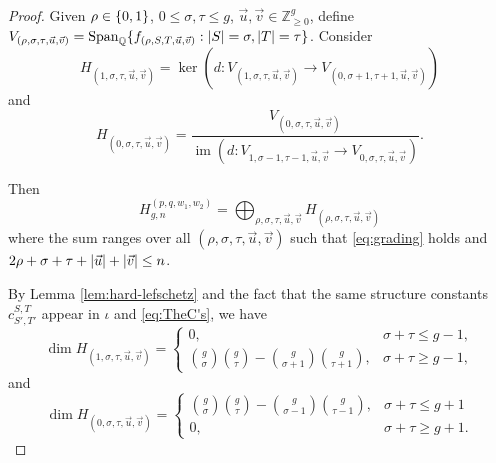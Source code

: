 \documentclass[10pt,a4paper]{amsart}
\DeclareMathOperator{\im}{im}
\DeclarePairedDelimiter{\abs}{\lvert}{\rvert}
\DeclarePairedDelimiter{\set}{\{}{\}}
\newcommand\Q{{\mathbb Q}}
\newcommand\Z{{\mathbb Z}}
\begin{document}
\begin{proof}

Given $\rho\in \set{0,1}$, $0\leq \sigma,\tau\leq g$, $\vec u,\vec v\in \Z_{\geq 0}^g$, define $V_{(\rho,\sigma,\tau,\vec u,\vec v)}=\mathrm{Span}_\Q\set{f_{(\rho,S,T,\vec u,\vec v)}: \abs{S}=\sigma, \abs{T}=\tau}$. Consider
\begin{equation}
    H_{(1,\sigma,\tau,\vec u,\vec v)}=\ker(d:V_{(1,\sigma,\tau,\vec u,\vec v)}\to V_{(0,\sigma+1,\tau+1,\vec u,\vec v)})
\end{equation}
and
\begin{equation}
    H_{(0,\sigma,\tau,\vec u,\vec v)}=\frac{V_{(0,\sigma,\tau,\vec u,\vec v)}}{\im(d:V_{1,\sigma-1,\tau-1,\vec u,\vec v}\to V_{0,\sigma,\tau,\vec u,\vec v})}.
\end{equation}

Then
\begin{equation}
    H_{g,n}^{(p,q,w_1,w_2)}=\bigoplus_{\rho,\sigma,\tau,\vec u,\vec v}H_{(\rho,\sigma,\tau,\vec u,\vec v)}
\end{equation}
where the sum ranges over all $(\rho,\sigma,\tau,\vec u,\vec v)$ such that \eqref{eq:grading} holds and $2\rho+\sigma+\tau+\abs{\vec u}+\abs{\vec v}\leq n$. 

By Lemma \ref{lem:hard-lefschetz} and the fact that the same structure constants $c^{S,T}_{S',T'}$ appear in $\iota$ and \eqref{eq:TheC's}, we have
\begin{equation}
    \dim H_{(1,\sigma,\tau,\vec u,\vec v)}=
    \begin{cases}
        0, & \sigma+\tau\leq g-1,\\
        \binom{g}{\sigma}\binom{g}{\tau}-\binom{g}{\sigma+1}\binom{g}{\tau+1}, & \sigma+\tau\geq g-1,
    \end{cases}
\end{equation}
and
\begin{equation}
    \dim H_{(0,\sigma,\tau,\vec u,\vec v)}=
    \begin{cases}
        \binom{g}{\sigma}\binom{g}{\tau}-\binom{g}{\sigma-1}\binom{g}{\tau-1}, & \sigma+\tau\leq g+1\\
        0, &\sigma+\tau\geq g+1.
    \end{cases}
\end{equation}


\end{proof}
\end{document}
